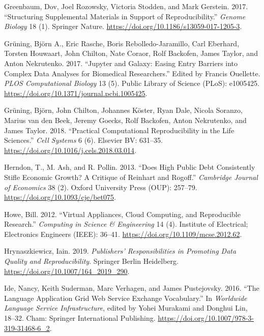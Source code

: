 \documentclass[onecolumn]{article}
\begin{document}
\leavevmode\hypertarget{ref-greenbaum2017structuring}{}%
Greenbaum, Dov, Joel Rozowsky, Victoria Stodden, and Mark Gerstein.
2017. ``Structuring Supplemental Materials in Support of
Reproducibility.'' \emph{Genome Biology} 18 (1). Springer Nature.
\url{https://doi.org/10.1186/s13059-017-1205-3}.

\leavevmode\hypertarget{ref-gruning2017jupyter}{}%
Grüning, Björn A., Eric Rasche, Boris Rebolledo-Jaramillo, Carl
Eberhard, Torsten Houwaart, John Chilton, Nate Coraor, Rolf Backofen,
James Taylor, and Anton Nekrutenko. 2017. ``Jupyter and Galaxy: Easing
Entry Barriers into Complex Data Analyses for Biomedical Researchers.''
Edited by Francis Ouellette. \emph{PLOS Computational Biology} 13 (5).
Public Library of Science (PLoS): e1005425.
\url{https://doi.org/10.1371/journal.pcbi.1005425}.

\leavevmode\hypertarget{ref-Gr_ning_2018}{}%
Grüning, Björn, John Chilton, Johannes Köster, Ryan Dale, Nicola
Soranzo, Marius van den Beek, Jeremy Goecks, Rolf Backofen, Anton
Nekrutenko, and James Taylor. 2018. ``Practical Computational
Reproducibility in the Life Sciences.'' \emph{Cell Systems} 6 (6).
Elsevier BV: 631--35. \url{https://doi.org/10.1016/j.cels.2018.03.014}.

\leavevmode\hypertarget{ref-herndon2014does}{}%
Herndon, T., M. Ash, and R. Pollin. 2013. ``Does High Public Debt
Consistently Stifle Economic Growth? A Critique of Reinhart and
Rogoff.'' \emph{Cambridge Journal of Economics} 38 (2). Oxford
University Press (OUP): 257--79.
\url{https://doi.org/10.1093/cje/bet075}.

\leavevmode\hypertarget{ref-howe2012}{}%
Howe, Bill. 2012. ``Virtual Appliances, Cloud Computing, and
Reproducible Research.'' \emph{Computing in Science \& Engineering} 14
(4). Institute of Electrical; Electronics Engineers (IEEE): 36--41.
\url{https://doi.org/10.1109/mcse.2012.62}.

\leavevmode\hypertarget{ref-hrynaszkiewicz2019publishers}{}%
Hrynaszkiewicz, Iain. 2019. \emph{Publishers' Responsibilities in
Promoting Data Quality and Reproducibility}. Springer Berlin Heidelberg.
\url{https://doi.org/10.1007/164_2019_290}.

\leavevmode\hypertarget{ref-ide2015language}{}%
Ide, Nancy, Keith Suderman, Marc Verhagen, and James Pustejovsky. 2016.
``The Language Application Grid Web Service Exchange Vocabulary.'' In
\emph{Worldwide Language Service Infrastructure}, edited by Yohei
Murakami and Donghui Lin, 18--32. Cham: Springer International
Publishing. \url{https://doi.org/10.1007/978-3-319-31468-6_2}.
\end{document}

